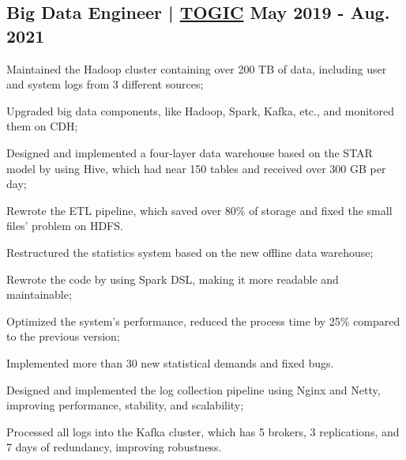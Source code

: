 \subsection{{Big Data Engineer | \href{http://www.51togic.com}{TOGIC} \hfill May 2019 - Aug. 2021}}
\begin{zitemize}
    \item Maintained the Hadoop cluster containing over 200 TB of data, including user and system logs from 3 different sources;
    \item Upgraded big data components, like Hadoop, Spark, Kafka, etc., and monitored them on CDH;
    \item Designed and implemented a four-layer data warehouse based on the STAR model by using Hive, which had near 150 tables and received over 300 GB per day;
    \item Rewrote the ETL pipeline, which saved over 80\% of storage and fixed the small files' problem on HDFS.
\end{zitemize}
\begin{zitemize}
    \item Restructured the statistics system based on the new offline data warehouse;
    \item Rewrote the code by using Spark DSL, making it more readable and maintainable;
    \item Optimized the system's performance, reduced the process time by 25\% compared to the previous version;
    \item Implemented more than 30 new statistical demands and fixed bugs.
\end{zitemize}
\begin{zitemize}
    \item Designed and implemented the log collection pipeline using Nginx and Netty, improving performance, stability, and scalability;
    \item Processed all logs into the Kafka cluster, which has 5 brokers, 3 replications, and 7 days of redundancy, improving robustness.
\end{zitemize}



